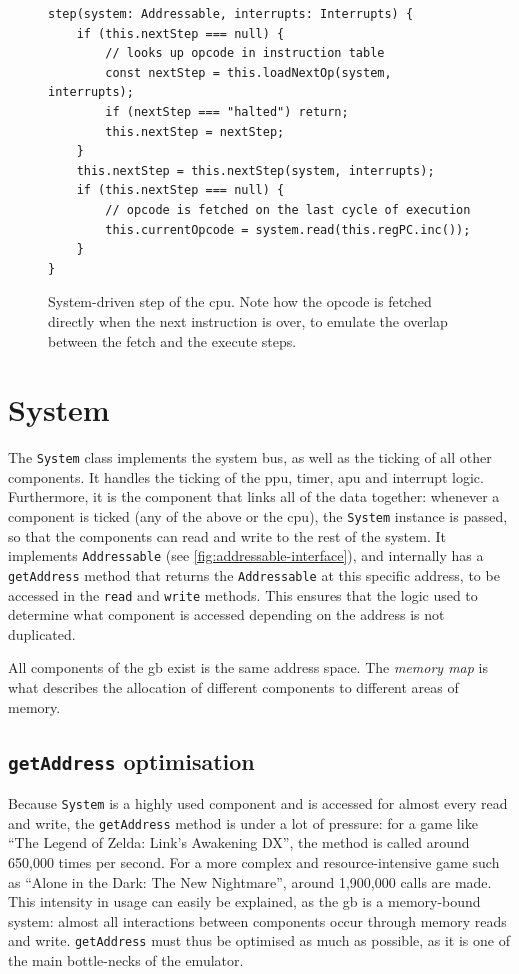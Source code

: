 \documentclass[11pt]{informatics-report}
\begin{document}
\begin{figure}[h]
    \begin{verbatim}
step(system: Addressable, interrupts: Interrupts) {
    if (this.nextStep === null) {
        // looks up opcode in instruction table
        const nextStep = this.loadNextOp(system, interrupts);
        if (nextStep === "halted") return;
        this.nextStep = nextStep;
    }
    this.nextStep = this.nextStep(system, interrupts);
    if (this.nextStep === null) {
        // opcode is fetched on the last cycle of execution
        this.currentOpcode = system.read(this.regPC.inc());
    }
}
    \end{verbatim}
    \caption{System-driven step of the \gls{cpu}. Note how the opcode is fetched directly when the next instruction is over, to emulate the overlap between the fetch and the execute steps.}
    \label{fig:system-driven-cpu-tick}
\end{figure}


\section{System}

The \texttt{System} class implements the system bus, as well as the ticking of all other components. It handles the ticking of the \gls{ppu}, timer, \gls{apu} and interrupt logic. Furthermore, it is the component that links all of the data together: whenever a component is ticked (any of the above or the \gls{cpu}), the \texttt{System} instance is passed, so that the components can read and write to the rest of the system. It implements \texttt{Addressable} (see \ref{fig:addressable-interface}), and internally has a \texttt{getAddress} method that returns the \texttt{Addressable} at this specific address, to be accessed in the \texttt{read} and \texttt{write} methods. This ensures that the logic used to determine what component is accessed depending on the address is not duplicated.

All components of the \glsdesc{gb} exist is the same address space. The \textit{memory map} is what describes the allocation of different components to different areas of memory.

\subsection{\texttt{getAddress} optimisation}

Because \texttt{System} is a highly used component and is accessed for almost every read and write, the \texttt{getAddress} method is under a lot of pressure: for a game like ``The Legend of Zelda: Link's Awakening DX'', the method is called around 650,000 times per second. For a more complex and resource-intensive game such as ``Alone in the Dark: The New Nightmare'', around 1,900,000 calls are made. This intensity in usage can easily be explained, as the \gls{gb} is a memory-bound system: almost all interactions between components occur through memory reads and write. \texttt{getAddress} must thus be optimised as much as possible, as it is one of the main bottle-necks of the emulator.
\end{document}
